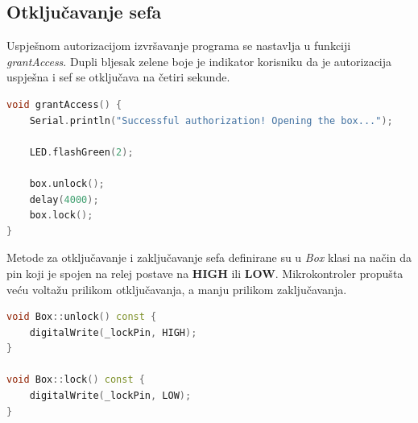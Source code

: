 \subsection{Otključavanje sefa}

Uspješnom autorizacijom izvršavanje programa se nastavlja u funkciji \textit{grantAccess}.
Dupli bljesak zelene boje je indikator korisniku da je autorizacija uspješna i sef se otključava na četiri sekunde.

\begin{lstlisting}[language=C++]
void grantAccess() {
    Serial.println("Successful authorization! Opening the box...");

    LED.flashGreen(2);

    box.unlock();
    delay(4000);
    box.lock();
}
\end{lstlisting}

Metode za otključavanje i zaključavanje sefa definirane su u \textit{Box} klasi na način da pin koji je spojen na relej
postave na \textbf{HIGH} ili \textbf{LOW}.
Mikrokontroler propušta veću voltažu prilikom otključavanja, a manju prilikom zaključavanja.

\begin{lstlisting}[language=C++]
void Box::unlock() const {
    digitalWrite(_lockPin, HIGH);
}

void Box::lock() const {
    digitalWrite(_lockPin, LOW);
}
\end{lstlisting}

